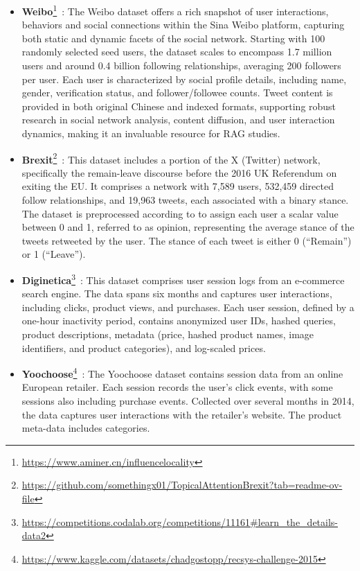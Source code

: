 \begin{itemize}[leftmargin=*]
    \item \textbf{Weibo}\footnote{\href{https://www.aminer.cn/influencelocality}{https://www.aminer.cn/influencelocality}}~\cite{zhang2013social}: The Weibo dataset offers a rich snapshot of user interactions, behaviors and social connections within the Sina Weibo platform, capturing both static and dynamic facets of the social network. Starting with 100 randomly selected seed users, the dataset scales to encompass 1.7 million users and around 0.4 billion following relationships, averaging 200 followers per user. Each user is characterized by social profile details, including name, gender, verification status, and follower/followee counts. Tweet content is provided in both original Chinese and indexed formats, supporting robust research in social network analysis, content diffusion, and user interaction dynamics, making it an invaluable resource for RAG studies.


    \item \textbf{Brexit}\footnote{\href{https://github.com/somethingx01/TopicalAttentionBrexit?tab=readme-ov-file}{https://github.com/somethingx01/TopicalAttentionBrexit?tab=readme-ov-file}}~\cite{zhu2020neural}: This dataset includes a portion of the X (Twitter) network, specifically the remain-leave discourse before the 2016 UK Referendum on exiting the EU. It comprises a network with 7,589 users, 532,459 directed follow relationships, and 19,963 tweets, each associated with a binary stance. The dataset is preprocessed according to \cite{minici2022cascade} to assign each user a scalar value between 0 and 1, referred to as opinion, representing the average stance of the tweets retweeted by the user. The stance of each tweet is either 0 (“Remain”) or 1 (“Leave”).


    \item \textbf{Diginetica}\footnote{\href{https://competitions.codalab.org/competitions/11161\#learn_the_details-data2}{https://competitions.codalab.org/competitions/11161\#learn\_the\_details-data2}}~\cite{wang2024knowledge2}: This dataset comprises user session logs from an e-commerce search engine. The data spans six months and captures user interactions, including clicks, product views, and purchases. Each user session, defined by a one-hour inactivity period, contains anonymized user IDs, hashed queries, product descriptions, metadata (price, hashed product names, image identifiers, and product categories), and log-scaled prices.

    \item \textbf{Yoochoose}\footnote{\href{https://www.kaggle.com/datasets/chadgostopp/recsys-challenge-2015}{https://www.kaggle.com/datasets/chadgostopp/recsys-challenge-2015}}~\cite{wang2024knowledge2}: The Yoochoose dataset contains session data from an online European retailer. Each session records the user's click events, with some sessions also including purchase events. Collected over several months in 2014, the data captures user interactions with the retailer's website. The product meta-data includes categories.
\end{itemize}

